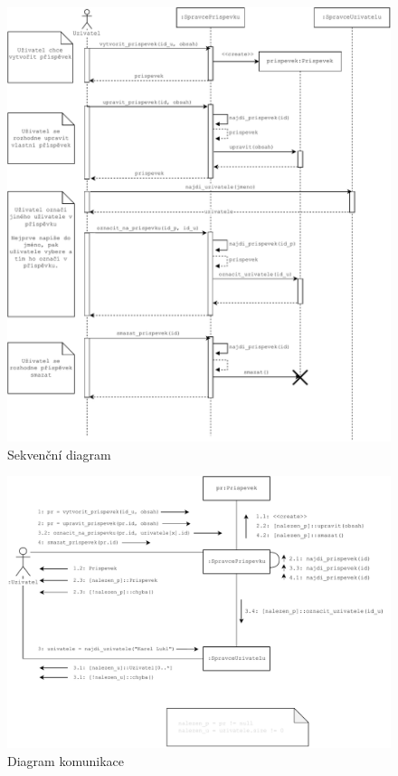 \documentclass{article}
\begin{document}
\begin{figure}[p]
    \centering
    \includegraphics[scale=0.9]{fig/sekvencni.drawio.pdf}
    \caption{Sekvenční diagram}
\end{figure}

\begin{figure}[p]
    \centering
    \includegraphics[scale=0.9]{fig/komunikace.drawio.pdf}
    \caption{Diagram komunikace}
\end{figure}
\end{document}
